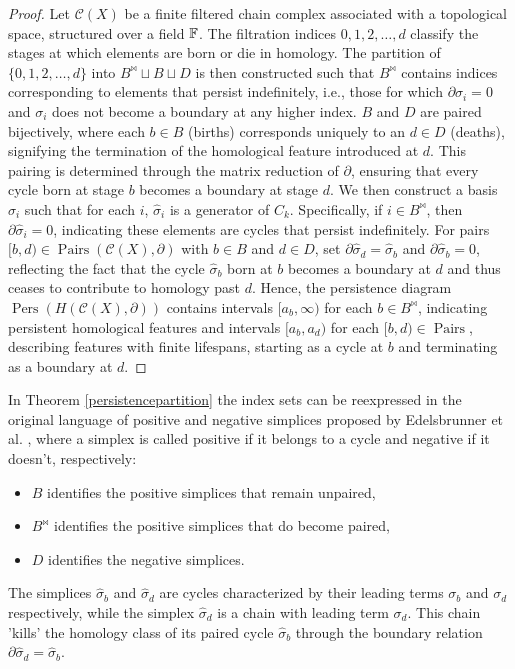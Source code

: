 \begin{proof}
	Let $\mathcal{C}(X)$ be a finite filtered chain complex associated with
	a topological space, structured over a field ${\mathbb{F}}$. The filtration indices ${0, 1, 2, \ldots, d}$
	classify the stages at which elements are born or die in homology. The
	partition of $\{0, 1, 2, \ldots, d\}$ into $B^{\Join} \sqcup B \sqcup D$ is then constructed such that $B^{\Join}$ contains indices corresponding to elements that persist indefinitely, i.e., those for which $\partial\sigma_{i} = 0$ and $\sigma_{i}$ does not become a boundary at any higher index. $B$ and $D$ are paired bijectively, where each $b \in B$ (births) corresponds uniquely to an $d \in D$ (deaths), signifying the termination of the homological feature introduced at $d$. This pairing is determined through the matrix reduction of $\partial$, ensuring that every cycle born at stage $b$ becomes a boundary at stage $d$. We then construct a basis ${\hat{\sigma}_i}$ such that for each $i$, $\hat{\sigma}_{i}$ is a generator of $C_k$. Specifically, if $i \in B^{\Join}$, then
	$\partial\hat{\sigma}_{i} = 0$, indicating these elements are cycles that persist
	indefinitely. For pairs $[b, d) \in \operatorname{Pairs}(\mathcal{C}(X), \partial)$
	with $b \in B$ and $d \in D$, set $\partial\hat{\sigma}_{d} = \hat{\sigma}_{b}$
	and $\partial\hat{\sigma}_{b} = 0$, reflecting the fact that the cycle
	$\hat{\sigma}_{b}$ born at $b$ becomes a boundary at $d$ and thus ceases to
	contribute to homology past $d$. Hence, the persistence diagram $\operatorname{Pers}(H(\mathcal{C}(X), \partial))$ contains
	intervals $[a_{b}, \infty)$ for each $b \in B^{\Join}$, indicating persistent
	homological features and intervals $[a_{b}, a_{d})$ for each
	$[b, d) \in \operatorname{Pairs}$, describing features with finite lifespans,
	starting as a cycle at $b$ and terminating as a boundary at $d$.
\end{proof}

\begin{remark}{\cite[\S 2, p.516]{Edelsbrunner2000}}
In Theorem \ref{persistencepartition} the index sets can be reexpressed in the original language of positive and negative simplices proposed by Edelsbrunner et al. \cite[p.8]{de2011dualities}, where a simplex is called positive if it belongs to a cycle and negative if it doesn't, respectively:
\begin{itemize}
	\item $B$ identifies the positive simplices that remain unpaired,
	\item $B^{\Join}$ identifies the positive simplices that do become paired,
	\item $D$ identifies the negative simplices.
\end{itemize}
The simplices $\hat{\sigma}_{b}$ and $\hat{\sigma}_{d}$ are cycles characterized by
their leading terms $\sigma_{b}$ and $\sigma_{d}$ respectively, while the simplex
$\hat{\sigma}_{d}$ is a chain with leading term $\sigma_{d}$. This chain 'kills'
the homology class of its paired cycle $\hat{\sigma}_{b}$ through the boundary relation
$\partial \hat{\sigma}_{d} = \hat{\sigma}_{b}$.
\end{remark}

